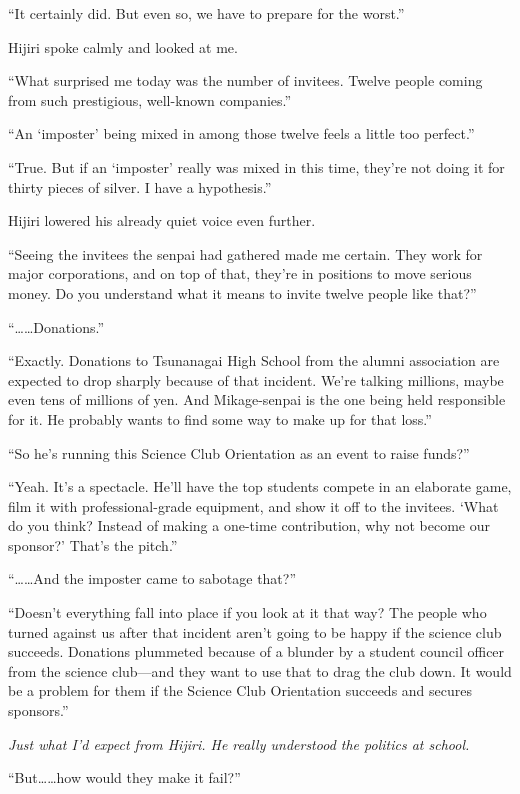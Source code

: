 \documentclass[
    a4paper,
    12pt,
    twoside,
    openany,
    UTF8,
    fontset=windows
]{ctexbook}
\begin{document}
``It certainly did. But even so, we have to prepare for the worst.''

Hijiri spoke calmly and looked at me.

``What surprised me today was the number of invitees. Twelve people coming from such prestigious, well-known companies.''

``An `imposter' being mixed in among those twelve feels a little too perfect.''

``True. But if an `imposter' really was mixed in this time, they're not doing it for thirty pieces of silver. I have a hypothesis.''

Hijiri lowered his already quiet voice even further.

``Seeing the invitees the senpai had gathered made me certain. They work for major corporations, and on top of that, they're in positions to move serious money. Do you understand what it means to invite twelve people like that?''

``\dots\dots Donations.''

``Exactly. Donations to Tsunanagai High School from the alumni association are expected to drop sharply because of that incident. We're talking millions, maybe even tens of millions of yen. And Mikage-senpai is the one being held responsible for it. He probably wants to find some way to make up for that loss.''

``So he's running this Science Club Orientation as an event to raise funds?''

``Yeah. It's a spectacle. He'll have the top students compete in an elaborate game, film it with professional-grade equipment, and show it off to the invitees. `What do you think? Instead of making a one-time contribution, why not become our sponsor?' That's the pitch.''

``\dots\dots And the imposter came to sabotage that?''

``Doesn't everything fall into place if you look at it that way? The people who turned against us after that incident aren't going to be happy if the science club succeeds. Donations plummeted because of a blunder by a student council officer from the science club---and they want to use that to drag the club down. It would be a problem for them if the Science Club Orientation succeeds and secures sponsors.''

\textit{Just what I'd expect from Hijiri. He really understood the politics at school.}

``But\dots\dots how would they make it fail?''
\end{document}

